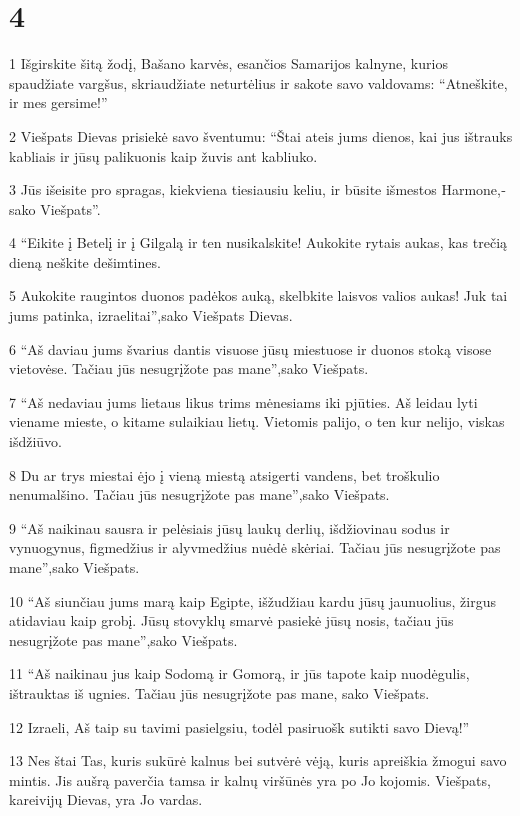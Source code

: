 \chapter{4}


\par 1 Išgirskite šitą žodį, Bašano karvės, esančios Samarijos kalnyne, kurios spaudžiate vargšus, skriaudžiate neturtėlius ir sakote savo valdovams: “Atneškite, ir mes gersime!” 
\par 2 Viešpats Dievas prisiekė savo šventumu: “Štai ateis jums dienos, kai jus ištrauks kabliais ir jūsų palikuonis kaip žuvis ant kabliuko. 
\par 3 Jūs išeisite pro spragas, kiekviena tiesiausiu keliu, ir būsite išmestos Harmone,­sako Viešpats”. 
\par 4 “Eikite į Betelį ir į Gilgalą ir ten nusikalskite! Aukokite rytais aukas, kas trečią dieną neškite dešimtines. 
\par 5 Aukokite raugintos duonos padėkos auką, skelbkite laisvos valios aukas! Juk tai jums patinka, izraelitai”,­sako Viešpats Dievas. 
\par 6 “Aš daviau jums švarius dantis visuose jūsų miestuose ir duonos stoką visose vietovėse. Tačiau jūs nesugrįžote pas mane”,­sako Viešpats. 
\par 7 “Aš nedaviau jums lietaus likus trims mėnesiams iki pjūties. Aš leidau lyti viename mieste, o kitame sulaikiau lietų. Vietomis palijo, o ten kur nelijo, viskas išdžiūvo. 
\par 8 Du ar trys miestai ėjo į vieną miestą atsigerti vandens, bet troškulio nenumalšino. Tačiau jūs nesugrįžote pas mane”,­sako Viešpats. 
\par 9 “Aš naikinau sausra ir pelėsiais jūsų laukų derlių, išdžiovinau sodus ir vynuogynus, figmedžius ir alyvmedžius nuėdė skėriai. Tačiau jūs nesugrįžote pas mane”,­sako Viešpats. 
\par 10 “Aš siunčiau jums marą kaip Egipte, išžudžiau kardu jūsų jaunuolius, žirgus atidaviau kaip grobį. Jūsų stovyklų smarvė pasiekė jūsų nosis, tačiau jūs nesugrįžote pas mane”,­sako Viešpats. 
\par 11 “Aš naikinau jus kaip Sodomą ir Gomorą, ir jūs tapote kaip nuodėgulis, ištrauktas iš ugnies. Tačiau jūs nesugrįžote pas mane,­ sako Viešpats.­ 
\par 12 Izraeli, Aš taip su tavimi pasielgsiu, todėl pasiruošk sutikti savo Dievą!” 
\par 13 Nes štai Tas, kuris sukūrė kalnus bei sutvėrė vėją, kuris apreiškia žmogui savo mintis. Jis aušrą paverčia tamsa ir kalnų viršūnės yra po Jo kojomis. Viešpats, kareivijų Dievas, yra Jo vardas.



